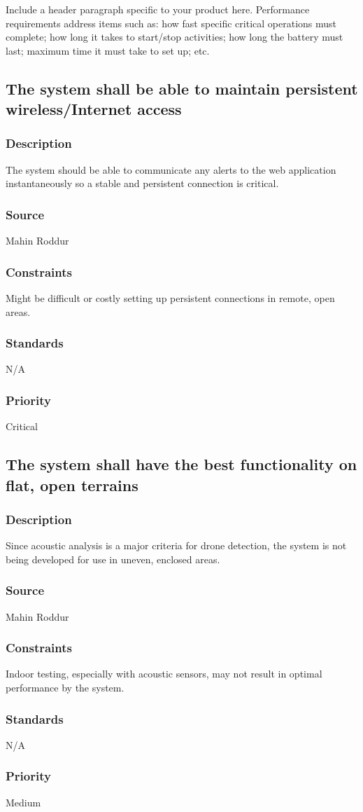 Include a header paragraph specific to your product here. Performance requirements address items such as: how fast specific critical operations must complete; how long it takes to start/stop activities; how long the battery must last; maximum time it must take to set up; etc.

\subsection{The system shall be able to maintain persistent wireless/Internet access}
\subsubsection{Description}
The system should be able to communicate any alerts to the web application instantaneously so a stable and persistent connection is critical.
\subsubsection{Source}
Mahin Roddur
\subsubsection{Constraints}
Might be difficult or costly setting up persistent connections in remote, open areas.
\subsubsection{Standards}
N/A
\subsubsection{Priority}
Critical

\subsection{The system shall have the best functionality on flat, open terrains}
\subsubsection{Description}
Since acoustic analysis is a major criteria for drone detection, the system is not being developed for use in uneven, enclosed areas.
\subsubsection{Source}
Mahin Roddur
\subsubsection{Constraints}
Indoor testing, especially with acoustic sensors, may not result in optimal performance by the system. 
\subsubsection{Standards}
N/A
\subsubsection{Priority}
Medium
